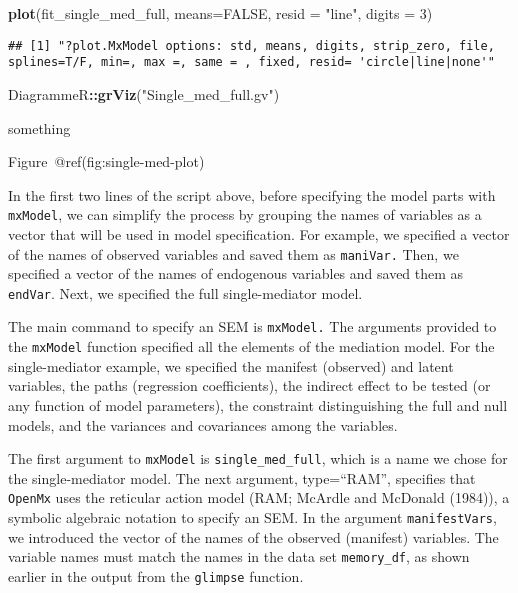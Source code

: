 \documentclass[11pt,]{article}
\newenvironment{Shaded}{\begin{snugshade}}{\end{snugshade}}
\newcommand{\DataTypeTok}[1]{\textcolor[rgb]{0.13,0.29,0.53}{#1}}
\newcommand{\DecValTok}[1]{\textcolor[rgb]{0.00,0.00,0.81}{#1}}
\newcommand{\KeywordTok}[1]{\textcolor[rgb]{0.13,0.29,0.53}{\textbf{#1}}}
\newcommand{\NormalTok}[1]{#1}
\newcommand{\OperatorTok}[1]{\textcolor[rgb]{0.81,0.36,0.00}{\textbf{#1}}}
\newcommand{\OtherTok}[1]{\textcolor[rgb]{0.56,0.35,0.01}{#1}}
\newcommand{\StringTok}[1]{\textcolor[rgb]{0.31,0.60,0.02}{#1}}
\begin{document}
\begin{Shaded}
\begin{Highlighting}[]
\KeywordTok{plot}\NormalTok{(fit_single_med_full, }\DataTypeTok{means=}\OtherTok{FALSE}\NormalTok{, }\DataTypeTok{resid =} \StringTok{"line"}\NormalTok{, }\DataTypeTok{digits =} \DecValTok{3}\NormalTok{)}
\end{Highlighting}
\end{Shaded}

\begin{verbatim}
## [1] "?plot.MxModel options: std, means, digits, strip_zero, file, splines=T/F, min=, max =, same = , fixed, resid= 'circle|line|none'"
\end{verbatim}

\begin{Shaded}
\begin{Highlighting}[]
\NormalTok{DiagrammeR}\OperatorTok{::}\KeywordTok{grViz}\NormalTok{(}\StringTok{"Single_med_full.gv"}\NormalTok{)}
\end{Highlighting}
\end{Shaded}

\hypertarget{htmlwidget-7404136e1bfc36c2f9fa}{}

something

Figure~@ref(fig:single-med-plot)

In the first two lines of the script above, before specifying the model
parts with \texttt{mxModel}, we can simplify the process by grouping the
names of variables as a vector that will be used in model specification.
For example, we specified a vector of the names of observed variables
and saved them as \texttt{maniVar.} Then, we specified a vector of the
names of endogenous variables and saved them as \texttt{endVar}. Next,
we specified the full single-mediator model.

The main command to specify an SEM is \texttt{mxModel.} The arguments
provided to the \texttt{mxModel} function specified all the elements of
the mediation model. For the single-mediator example, we specified the
manifest (observed) and latent variables, the paths (regression
coefficients), the indirect effect to be tested (or any function of
model parameters), the constraint distinguishing the full and null
models, and the variances and covariances among the variables.

The first argument to \texttt{mxModel} is \texttt{single\_med\_full},
which is a name we chose for the single-mediator model. The next
argument, type=``RAM'', specifies that \texttt{OpenMx} uses the
reticular action model (RAM; McArdle and McDonald (1984)), a symbolic
algebraic notation to specify an SEM. In the argument
\texttt{manifestVars}, we introduced the vector of the names of the
observed (manifest) variables. The variable names must match the names
in the data set \texttt{memory\_df}, as shown earlier in the output from
the \texttt{glimpse} function.
\end{document}
